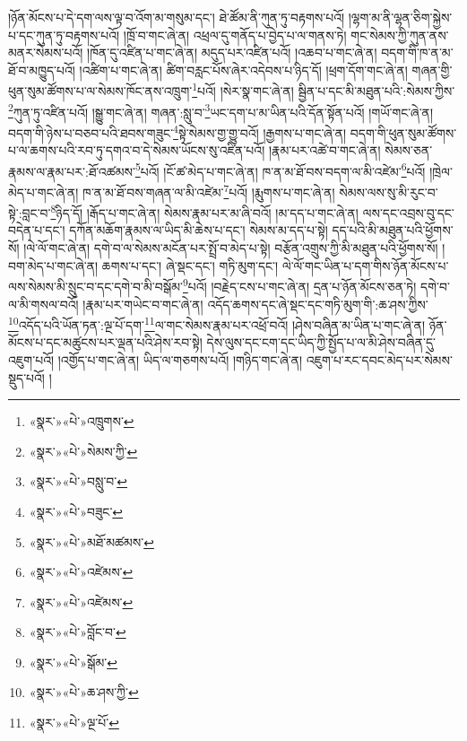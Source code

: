 །ཉོན་མོངས་པ་དེ་དག་ལས་ལྟ་བ་འོག་མ་གསུམ་དང་། ཐེ་ཚོམ་ནི་ཀུན་ཏུ་བརྟགས་པའོ། །ལྷག་མ་ནི་ལྷན་ཅིག་སྐྱེས་པ་དང་ཀུན་ཏུ་བརྟགས་པའོ། །ཁྲོ་བ་གང་ཞེ་ན། འཕྲལ་དུ་གནོད་པ་བྱེད་པ་ལ་གནས་ཏེ། གང་སེམས་ཀྱི་ཀུན་ནས་མནར་སེམས་པའོ། །ཁོན་དུ་འཛིན་པ་གང་ཞེ་ན། མདུད་པར་འཛིན་པའོ། །འཆབ་པ་གང་ཞེ་ན། བདག་གི་ཁ་ན་མ་ཐོ་བ་མཁྱུད་པའོ། །འཚིག་པ་གང་ཞེ་ན། ཚིག་བརླང་པོས་ཞེར་འདེབས་པ་ཉིད་དོ། །ཕྲག་དོག་གང་ཞེ་ན། གཞན་གྱི་ཕུན་སུམ་ཚོགས་པ་ལ་སེམས་ཁོང་ནས་འཁྲུག་\footnote{«སྣར་»«པེ་»འཁྲུགས་}པའོ། །སེར་སྣ་གང་ཞེ་ན། སྦྱིན་པ་དང་མི་མཐུན་པའི་:སེམས་ཀྱིས་\footnote{«སྣར་»«པེ་»སེམས་ཀྱི་}ཀུན་ཏུ་འཛིན་པའོ། །སྒྱུ་གང་ཞེ་ན། གཞན་:སླུ་བ་\footnote{«སྣར་»«པེ་»བསླུ་བ་}ཡང་དག་པ་མ་ཡིན་པའི་དོན་སྟོན་པའོ། །གཡོ་གང་ཞེ་ན། བདག་གི་ཉེས་པ་བཅབ་པའི་ཐབས་གཟུང་\footnote{«སྣར་»«པེ་»བཟུང་}སྟེ་སེམས་གྱ་གྱུ་བའོ། །རྒྱགས་པ་གང་ཞེ་ན། བདག་གི་ཕུན་སུམ་ཚོགས་པ་ལ་ཆགས་པའི་རབ་ཏུ་དགའ་བ་དེ་སེམས་ཡོངས་སུ་འཛིན་པའོ། །རྣམ་པར་འཚེ་བ་གང་ཞེ་ན། སེམས་ཅན་རྣམས་ལ་རྣམ་པར་:ཐོ་འཚམས་\footnote{«སྣར་»«པེ་»མཐོ་མཚམས་}པའོ། །ངོ་ཚ་མེད་པ་གང་ཞེ་ན། ཁ་ན་མ་ཐོ་བས་བདག་ལ་མི་འཛེམ་\footnote{«སྣར་»«པེ་»འཛེམས་}པའོ། །ཁྲེལ་མེད་པ་གང་ཞེ་ན། ཁ་ན་མ་ཐོ་བས་གཞན་ལ་མི་འཛེམ་\footnote{«སྣར་»«པེ་»འཛེམས་}པའོ། །རྨུགས་པ་གང་ཞེ་ན། སེམས་ལས་སུ་མི་རུང་བ་སྟེ་:བླང་བ་\footnote{«སྣར་»«པེ་»བློང་བ་}ཉིད་དོ། །རྒོད་པ་གང་ཞེ་ན། སེམས་རྣམ་པར་མ་ཞི་བའོ། །མ་དད་པ་གང་ཞེ་ན། ལས་དང་འབྲས་བུ་དང་བདེན་པ་དང་། དཀོན་མཆོག་རྣམས་ལ་ཡིད་མི་ཆེས་པ་དང་། སེམས་མ་དད་པ་སྟེ། དད་པའི་མི་མཐུན་པའི་ཕྱོགས་སོ། །ལེ་ལོ་གང་ཞེ་ན། དགེ་བ་ལ་སེམས་མངོན་པར་སྤྲོ་བ་མེད་པ་སྟེ། བརྩོན་འགྲུས་ཀྱི་མི་མཐུན་པའི་ཕྱོགས་སོ། །བག་མེད་པ་གང་ཞེ་ན། ཆགས་པ་དང་། ཞེ་སྡང་དང་། གཏི་མུག་དང་། ལེ་ལོ་གང་ཡིན་པ་དག་གིས་ཉོན་མོངས་པ་ལས་སེམས་མི་སྲུང་བ་དང་དགེ་བ་མི་བསྒོམ་\footnote{«སྣར་»«པེ་»སྒོམ་}པའོ། །བརྗེད་ངས་པ་གང་ཞེ་ན། དྲན་པ་ཉོན་མོངས་ཅན་ཏེ། དགེ་བ་ལ་མི་གསལ་བའོ། །རྣམ་པར་གཡེང་བ་གང་ཞེ་ན། འདོད་ཆགས་དང་ཞེ་སྡང་དང་གཏི་མུག་གི་:ཆ་ཤས་ཀྱིས་\footnote{«སྣར་»«པེ་»ཆ་ཤས་ཀྱི་}འདོད་པའི་ཡོན་ཏན་:ལྔ་པོ་དག་\footnote{«སྣར་»«པེ་»ལྔ་པོ་}ལ་གང་སེམས་རྣམ་པར་འཕྲོ་བའོ། །ཤེས་བཞིན་མ་ཡིན་པ་གང་ཞེ་ན། ཉོན་མོངས་པ་དང་མཚུངས་པར་ལྡན་པའི་ཤེས་རབ་སྟེ། དེས་ལུས་དང་ངག་དང་ཡིད་ཀྱི་སྤྱོད་པ་ལ་མི་ཤེས་བཞིན་དུ་འཇུག་པའོ། །འགྱོད་པ་གང་ཞེ་ན། ཡིད་ལ་གཅགས་པའོ། །གཉིད་གང་ཞེ་ན། འཇུག་པ་རང་དབང་མེད་པར་སེམས་སྡུད་པའོ། །
